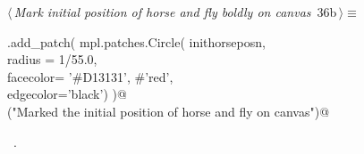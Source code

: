 \documentclass[11.5pt]{report}
\begin{document}
\begin{flushleft}
\begin{list}{}{\setlength{\itemsep}{-\parsep}\setlength{\itemindent}{-\leftmargin}}
\item{}
\end{list}
\vspace{4ex}
\end{flushleft}
\vspace{-0.8cm}\newchunk 
\begin{flushleft} \small\label{scrap33}\raggedright\small
{} $\langle\,${\itshape Mark initial position of horse and fly boldly on canvas}\nobreak\ {\footnotesize {36b}}$\,\rangle\equiv$
\vspace{-1ex}
\begin{list}{}{} \item
\mbox{}\verb@ax.add_patch( mpl.patches.Circle( inithorseposn, \@\\
\mbox{}\verb@                                  radius = 1/55.0,\@\\
\mbox{}\verb@                                  facecolor= '#D13131', #'red',\@\\
\mbox{}\verb@                                  edgecolor='black')  )@\\
\mbox{}\verb@debug("Marked the initial position of horse and fly on canvas")@\\
\mbox{}\verb@@{\NWsep}
\end{list}
\vspace{-1.5ex}
\footnotesize
\begin{list}{}{\setlength{\itemsep}{-\parsep}\setlength{\itemindent}{-\leftmargin}}
\item \NWtxtMacroRefIn\ .

\item{}
\end{list}
\vspace{4ex}
\end{flushleft}
\end{document}
